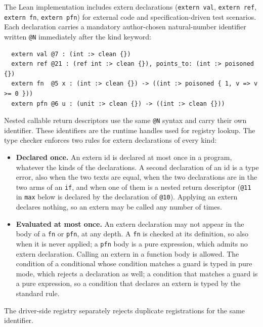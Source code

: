 \documentclass[12pt]{article}
\begin{document}
The Lean implementation includes extern declarations (\texttt{extern val},
\texttt{extern ref}, \texttt{extern fn}, \texttt{extern pfn}) for external
code and specification-driven test scenarios.  Each declaration carries a
mandatory author-chosen natural-number identifier written \texttt{@N}
immediately after the kind keyword:
\begin{verbatim}
  extern val @7 : (int :> clean {})
  extern ref @21 : (ref int :> clean {}), points_to: (int :> poisoned {})
  extern fn  @5 x : (int :> clean {}) -> ((int :> poisoned { 1, v => v >= 0 }))
  extern pfn @6 u : (unit :> clean {}) -> ((int :> clean {}))
\end{verbatim}
Nested callable return descriptors use the same \texttt{@N} syntax and carry
their own identifier.  These identifiers are the runtime handles used for
registry lookup.  The type checker enforces two rules for extern declarations
of every kind:
\begin{itemize}
  \item \textbf{Declared once.}  An extern id is declared at most once in a
    program, whatever the kinds of the declarations.  A second declaration of
    an id is a type error, also when the two texts are equal, when the two
    declarations are in the two arms of an \texttt{if}, and when one of them
    is a nested return descriptor (\texttt{@11} in \texttt{max} below is
    declared by the declaration of \texttt{@10}).  Applying an extern
    declares nothing, so an extern may be called any number of times.
  \item \textbf{Evaluated at most once.}  An extern declaration may not
    appear in the body of a \texttt{fn} or \texttt{pfn}, at any depth.  A
    \texttt{fn} is checked at its definition, so also when it is never
    applied; a \texttt{pfn} body is a pure expression, which admits no
    extern declaration.  Calling an extern in a function body is allowed.
    The condition of a conditional whose condition matches a guard is typed
    in pure mode, which rejects a declaration as well; a condition that
    matches a guard is a pure expression, so a condition that declares an
    extern is typed by the standard rule.
\end{itemize}
The driver-side registry separately rejects duplicate registrations for the
same identifier.
\end{document}
